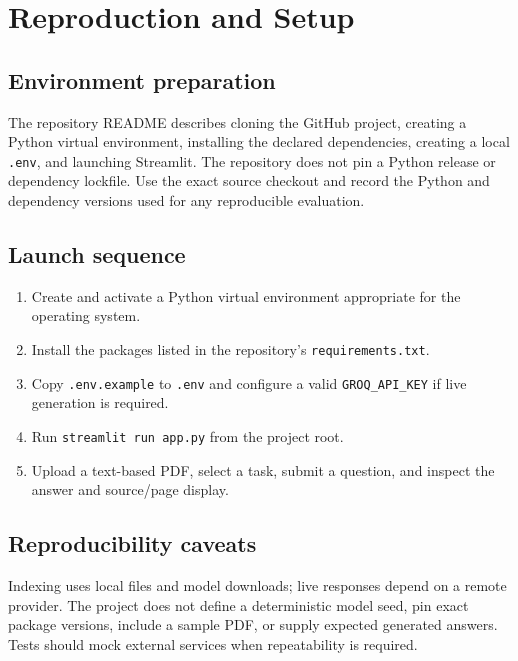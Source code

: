 \chapter{Reproduction and Setup}
\label{app:setup}

\section{Environment preparation}
The repository README describes cloning the GitHub project, creating a Python virtual environment, installing the declared dependencies, creating a local \texttt{.env}, and launching Streamlit. The repository does not pin a Python release or dependency lockfile. Use the exact source checkout and record the Python and dependency versions used for any reproducible evaluation.

\section{Launch sequence}
\begin{enumerate}
  \item Create and activate a Python virtual environment appropriate for the operating system.
  \item Install the packages listed in the repository's \texttt{requirements.txt}.
  \item Copy \texttt{.env.example} to \texttt{.env} and configure a valid \texttt{GROQ\_API\_KEY} if live generation is required.
  \item Run \texttt{streamlit run app.py} from the project root.
  \item Upload a text-based PDF, select a task, submit a question, and inspect the answer and source/page display.
\end{enumerate}

\section{Reproducibility caveats}
Indexing uses local files and model downloads; live responses depend on a remote provider. The project does not define a deterministic model seed, pin exact package versions, include a sample PDF, or supply expected generated answers. Tests should mock external services when repeatability is required.
